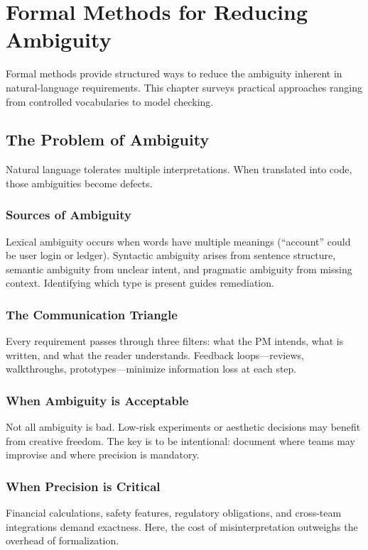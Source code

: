\chapter{Formal Methods for Reducing Ambiguity}
\label{ch:formal-methods}

Formal methods provide structured ways to reduce the ambiguity inherent in natural-language requirements. This chapter surveys practical approaches ranging from controlled vocabularies to model checking.

\section{The Problem of Ambiguity}
\label{sec:ambiguity-problem}

Natural language tolerates multiple interpretations. When translated into code, those ambiguities become defects.

\subsection{Sources of Ambiguity}
Lexical ambiguity occurs when words have multiple meanings (``account'' could be user login or ledger). Syntactic ambiguity arises from sentence structure, semantic ambiguity from unclear intent, and pragmatic ambiguity from missing context. Identifying which type is present guides remediation.

\subsection{The Communication Triangle}
Every requirement passes through three filters: what the PM intends, what is written, and what the reader understands. Feedback loops—reviews, walkthroughs, prototypes—minimize information loss at each step.

\subsection{When Ambiguity is Acceptable}
Not all ambiguity is bad. Low-risk experiments or aesthetic decisions may benefit from creative freedom. The key is to be intentional: document where teams may improvise and where precision is mandatory.

\subsection{When Precision is Critical}
Financial calculations, safety features, regulatory obligations, and cross-team integrations demand exactness. Here, the cost of misinterpretation outweighs the overhead of formalization.


